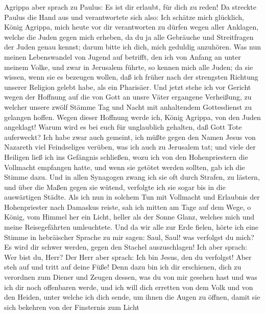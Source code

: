  Agrippa aber sprach zu Paulus: Es ist dir erlaubt, für
dich zu reden! Da streckte Paulus die Hand aus und verantwortete sich
also:  Ich schätze mich glücklich, König Agrippa, mich
heute vor dir verantworten zu dürfen wegen aller Anklagen, welche die
Juden gegen mich erheben,  da du ja alle Gebräuche und
Streitfragen der Juden genau kennst; darum bitte ich dich, mich geduldig
anzuhören.  Was nun meinen Lebenswandel von Jugend auf
betrifft, den ich von Anfang an unter meinem Volke, und zwar in
Jerusalem führte, so kennen mich alle Juden;  da sie
wissen, wenn sie es bezeugen wollen, daß ich früher nach der strengsten
Richtung unserer Religion gelebt habe, als ein Pharisäer. 
Und jetzt stehe ich vor Gericht wegen der Hoffnung auf die von Gott an
unsre Väter ergangene Verheißung,  zu welcher unsere zwölf
Stämme Tag und Nacht mit anhaltendem Gottesdienst zu gelangen hoffen.
Wegen dieser Hoffnung werde ich, König Agrippa, von den Juden angeklagt!
 Warum wird es bei euch für unglaublich gehalten, daß Gott
Tote auferweckt?  Ich habe zwar auch gemeint, ich müßte
gegen den Namen Jesus von Nazareth viel Feindseliges verüben,
 was ich auch zu Jerusalem tat; und viele der Heiligen
ließ ich ins Gefängnis schließen, wozu ich von den Hohenpriestern die
Vollmacht empfangen hatte, und wenn sie getötet werden sollten, gab ich
die Stimme dazu.  Und in allen Synagogen zwang ich sie
oft durch Strafen, zu lästern, und über die Maßen gegen sie wütend,
verfolgte ich sie sogar bis in die auswärtigen Städte. 
Als ich nun in solchem Tun mit Vollmacht und Erlaubnis der Hohenpriester
nach Damaskus reiste,  sah ich mitten am Tage auf dem
Wege, o König, vom Himmel her ein Licht, heller als der Sonne Glanz,
welches mich und meine Reisegefährten umleuchtete.  Und
da wir alle zur Erde fielen, hörte ich eine Stimme in hebräischer
Sprache zu mir sagen: Saul, Saul! was verfolgst du mich? Es wird dir
schwer werden, gegen den Stachel auszuschlagen!  Ich aber
sprach: Wer bist du, Herr? Der Herr aber sprach: Ich bin Jesus, den du
verfolgst!  Aber steh auf und tritt auf deine Füße! Denn
dazu bin ich dir erschienen, dich zu verordnen zum Diener und Zeugen
dessen, was du von mir gesehen hast und was ich dir noch offenbaren
werde,  und ich will dich erretten von dem Volk und von
den Heiden, unter welche ich dich sende,  um ihnen die
Augen zu öffnen, damit sie sich bekehren von der Finsternis zum Licht
